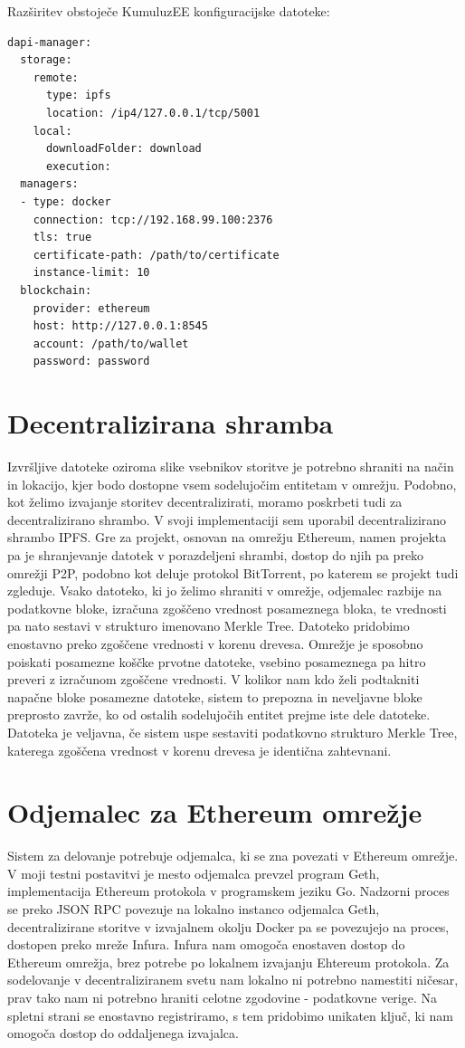 \documentclass[a4paper, 12pt]{book}
\begin{document}
Razširitev obstoječe KumuluzEE konfiguracijske datoteke:

\begin{lstlisting}
dapi-manager:
  storage:
    remote:
      type: ipfs
      location: /ip4/127.0.0.1/tcp/5001
    local:
      downloadFolder: download
      execution:
  managers:
  - type: docker
    connection: tcp://192.168.99.100:2376
    tls: true
    certificate-path: /path/to/certificate
    instance-limit: 10
  blockchain:
    provider: ethereum
    host: http://127.0.0.1:8545
    account: /path/to/wallet
    password: password
\end{lstlisting}

\section{Decentralizirana shramba}
Izvršljive datoteke oziroma slike vsebnikov storitve je potrebno shraniti na način in lokacijo, kjer bodo dostopne vsem sodelujočim entitetam v omrežju.
Podobno, kot želimo izvajanje storitev decentralizirati, moramo poskrbeti tudi za decentralizirano shrambo.
V svoji implementaciji sem uporabil decentralizirano shrambo IPFS.
Gre za projekt, osnovan na omrežju Ethereum, namen projekta pa je shranjevanje datotek v porazdeljeni shrambi, dostop do njih pa preko omrežji P2P, podobno kot deluje protokol BitTorrent, po katerem se projekt tudi zgleduje.
Vsako datoteko, ki jo želimo shraniti v omrežje, odjemalec razbije na podatkovne bloke, izračuna zgoščeno vrednost posameznega bloka, te vrednosti pa nato sestavi v strukturo imenovano Merkle Tree.
Datoteko pridobimo enostavno preko zgoščene vrednosti v korenu drevesa.
Omrežje je sposobno poiskati posamezne koščke prvotne datoteke, vsebino posameznega pa hitro preveri z izračunom zgoščene vrednosti. V kolikor nam kdo želi podtakniti napačne bloke posamezne datoteke, sistem to prepozna in neveljavne bloke preprosto zavrže, ko od ostalih sodelujočih entitet prejme iste dele datoteke. Datoteka je veljavna, če sistem uspe sestaviti podatkovno strukturo Merkle Tree, katerega zgoščena vrednost v korenu drevesa je identična zahtevnani. \cite{Ipfs}

\section{Odjemalec za Ethereum omrežje}
Sistem za delovanje potrebuje odjemalca, ki se zna povezati v Ethereum omrežje.
V moji testni postavitvi je mesto odjemalca prevzel program Geth, implementacija Ethereum protokola v programskem jeziku Go. \cite{Geth}
Nadzorni proces se preko JSON RPC povezuje na lokalno instanco odjemalca Geth, decentralizirane storitve v izvajalnem okolju Docker pa se 
povezujejo na proces, dostopen preko mreže Infura.
Infura nam omogoča enostaven dostop do Ethereum omrežja, brez potrebe po lokalnem izvajanju Ehtereum protokola.
Za sodelovanje v decentraliziranem svetu nam lokalno ni potrebno namestiti ničesar, prav tako nam ni potrebno hraniti
celotne zgodovine - podatkovne verige. 
Na spletni strani se enostavno registriramo, s tem pridobimo unikaten ključ, ki nam omogoča dostop do oddaljenega izvajalca. \cite{Infura}
\end{document}
